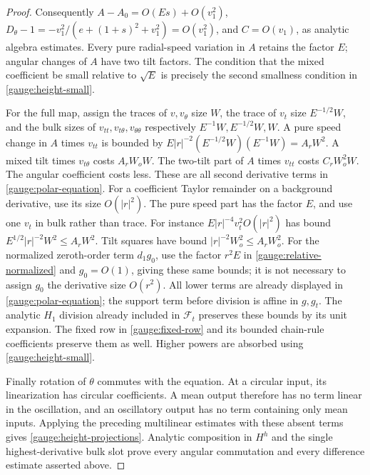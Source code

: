 \begin{proof}
Consequently $A-A_0=O(E s)+O(v_1^2)$,
$D_\theta-1=-v_1^2/(e+(1+s)^2+v_1^2)=O(v_1^2)$, and
$C=O(v_1)$, as analytic algebra estimates.
Every pure radial-speed variation in $A$ retains the factor $E$;
angular changes of $A$ have two tilt factors.  The condition that the
mixed coefficient be small relative to $\sqrt E$ is precisely the
second smallness condition in \eqref{gauge:height-small}.

For the full map, assign the traces of $v,v_\theta$ size $W$, the trace
of $v_t$ size $E^{-1/2}W$, and the bulk sizes of
$v_{tt},v_{t\theta},v_{\theta\theta}$ respectively
$E^{-1}W,E^{-1/2}W,W$.  A pure speed change in $A$ times $v_{tt}$ is
bounded by
$E|r|^{-2}(E^{-1/2}W)(E^{-1}W)=A_rW^2$.
A mixed tilt times $v_{t\theta}$ costs $A_rW_oW$.
The two-tilt part of $A$ times $v_{tt}$ costs $C_rW_o^2W$.
The angular coefficient costs less.  These are all second derivative
terms in \eqref{gauge:polar-equation}.
For a coefficient Taylor remainder on a background derivative, use its
size $O(|r|^2)$.  The pure speed part has the factor $E$, and use one
$v_t$ in bulk rather than trace.  For instance
$E|r|^{-4}v_t^2 O(|r|^2)$ has bound
$E^{1/2}|r|^{-2}W^2\le A_rW^2$.
Tilt squares have bound $|r|^{-2}W_o^2\le A_rW_o^2$.
For the normalized zeroth-order term $d_1g_0$, use the factor $r^2E$
in \eqref{gauge:relative-normalized} and $g_0=O(1)$, giving these same
bounds; it is not necessary to assign $g_0$ the derivative size $O(r^2)$.
All lower terms are already displayed in \eqref{gauge:polar-equation};
the support term before division is affine in $g,g_t$.
The analytic $H_1$ division already included in $\mathcal F_t$ preserves
these bounds by its unit expansion.  The fixed row in
\eqref{gauge:fixed-row} and its bounded chain-rule coefficients preserve
them as well.  Higher powers are absorbed using
\eqref{gauge:height-small}.

Finally rotation of $\theta$ commutes with the equation.  At a circular
input, its linearization has circular coefficients.  A mean output
therefore has no term linear in the oscillation, and an oscillatory output
has no term containing only mean inputs.  Applying the preceding
multilinear estimates with these absent terms gives
\eqref{gauge:height-projections}.  Analytic composition in $H^h$ and the
single highest-derivative bulk slot prove every angular commutation and
every difference estimate asserted above.
\end{proof}
